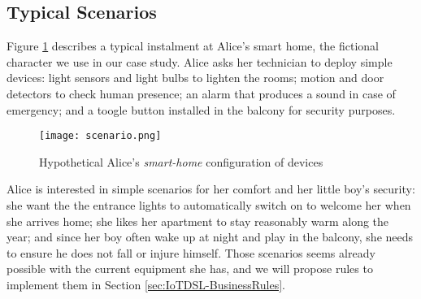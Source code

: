

\subsection{Typical \IOT Scenarios}
\label{sec:Motivation-Scenarios}

Figure \ref{fig:scenario} describes a typical instalment at Alice's smart home, the fictional character we use in our case study. Alice asks her technician to deploy simple devices: light sensors and light bulbs to lighten the rooms; motion and door detectors to check human presence; an alarm that produces a sound in case of emergency; and a toogle button installed in the balcony for security purposes. 

\begin{figure}%
	\centering  
	\texttt{[image: scenario.png]}%
	\caption{Hypothetical Alice's \textit{smart-home} configuration of \IOT devices}%
	\label{fig:scenario}%
\end{figure}

Alice is interested in simple scenarios for her comfort and her little boy's security: she want the the entrance lights to automatically switch on to welcome her when she arrives home; she likes her apartment to stay reasonably warm along the year; and since her boy often wake up at night and play in the balcony, she needs to ensure he does not fall or injure himself. Those scenarios seems already possible with the current equipment she has, and we will propose rules to implement them in Section \ref{sec:IoTDSL-BusinessRules}.


